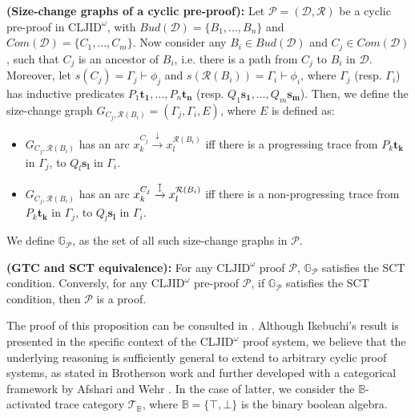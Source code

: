 \documentclass{article}
\begin{document}
\begin{definition}
    \textbf{(Size-change graphs of a cyclic pre-proof):} Let $\mathcal{P} = (\mathcal{D, \mathcal{R}})$ be a cyclic pre-proof in $\text{CLJID}^{\omega}$, with $Bud(\mathcal{D}) = \{B_1,...,B_n \}$ and $Com(\mathcal{D}) = \{C_1,...,C_m \}$. Now consider any $B_i \in Bud(\mathcal{D})$ and $C_j \in Com(\mathcal{D})$, such that $C_j$ is an ancestor of $B_i$, i.e. there is a path from $C_j$ to $B_i$ in $\mathcal{D}$. Moreover, let $s(C_j) = \Gamma_j \vdash \phi_j$ and $s(\mathcal{R}(B_i)) = \Gamma_i \vdash \phi_i$, where $\Gamma_j$ (resp. $\Gamma_i$) has inductive predicates $P_1\mathbf{t_1}, \ldots, P_n\mathbf{t_n}$ (resp. $Q_1\mathbf{s_1}, \ldots, Q_m\mathbf{s_m}$). Then, we define the size-change graph $G_{C_j, \mathcal{R}(B_i)} = (\Gamma_j, \Gamma_i, E)$, where $E$ is defined as:
    
    \begin{itemize}
        \item $G_{C_j, \mathcal{R}(B_i)}$ has an arc $x^{C_j}_k \xrightarrow{\downarrow} x^{\mathcal{R}(B_i)}_l$ iff there is a progressing trace from $P_k\mathbf{t_k}$ in $\Gamma_j$, to $Q_l\mathbf{s_l}$ in $\Gamma_i$.
        \item $G_{C_j, \mathcal{R}(B_i)}$ has an arc $x^{C_j}_k \xrightarrow{\downmapsto} x^{\mathcal{R}(B_i)}_l$ iff there is a non-progressing trace from $P_k\mathbf{t_k}$ in $\Gamma_j$, to $Q_l\mathbf{s_l}$ in $\Gamma_i$.    
    \end{itemize}

    We define $\mathbb{G}_{\mathcal{P}}$, as the set of all such size-change graphs in $\mathcal{P}$.
\end{definition}

\begin{proposition}
    \label{PropEqualCond}
    \textbf{(GTC and SCT equivalence):} For any $\text{CLJID}^{\omega}$ proof $\mathcal{P}$, $\mathbb{G}_{\mathcal{P}}$ satisfies the SCT condition. Conversly, for any $\text{CLJID}^{\omega}$ pre-proof $\mathcal{P}$, if $\mathbb{G}_{\mathcal{P}}$ satisfies the SCT condition, then $\mathcal{P}$ is a proof.
\end{proposition}

The proof of this proposition can be consulted in \cite{Mirai}. Although Ikebuchi's result is presented in the specific context of the $\text{CLJID}^{\omega}$ proof system, we believe that the underlying reasoning is sufficiently general to extend to arbitrary cyclic proof systems, as stated in Brotherson work \cite{Brotherston1} and further developed with a categorical framework by Afshari and Wehr \cite{Afshari_Wehr_2024}. In the case of latter, we consider the $\mathbb{B}$-activated trace category $\mathcal{T}_{\mathbb{B}}$, where $\mathbb{B} = \{\top, \bot\}$ is the binary boolean algebra.
\end{document}
